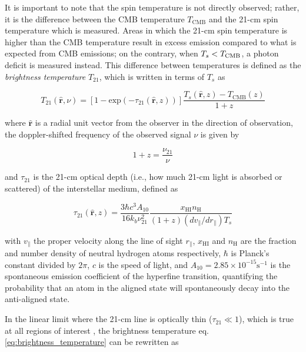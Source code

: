 \documentclass[floats,floatfix,showpacs,amssymb,prd,superscriptaddress,nofootinbib, 11pt]{revtex4-2} %
\newcommand{\lt}{\ensuremath <}
\begin{document}
It is important to note that the spin temperature is not directly observed; rather, it is the difference between the CMB temperature $T_{\text{CMB}}$ and the 21-cm spin temperature which is measured. Areas in which the 21-cm spin temperature is higher than the CMB temperature result in excess emission compared to what is expected from CMB emissions; on the contrary, when $T_s \lt T_{\text{CMB}}$, a photon deficit is measured instead. This difference between temperatures is defined as the \textit{brightness temperature} $T_{21}$, which is written in terms of $T_s$ as \citep{Furlanetto_2006}

\begin{equation}
    T_{21} (\hat{\textbf{r}}, \nu) = \left[1 - \text{exp}(-\tau_{21}(\hat{\textbf{r}}, z)) \right] \frac{T_s(\hat{\textbf{r}}, z) - T_{\text{CMB}} (z)}{1 + z}
    \label{eq:brightness_temperature}
\end{equation}

\noindent where $\hat{\textbf{r}}$ is a radial unit vector from the observer in the direction of observation, the doppler-shifted frequency of the observed signal $\nu$ is given by

\begin{equation}
    1 + z = \frac{\nu_{21}}{\nu}
\end{equation}

\noindent and $\tau_{21}$ is the 21-cm optical depth (i.e., how much 21-cm light is absorbed or scattered) of the interstellar medium, defined as 

\begin{equation}
    \tau_{21} (\hat{\textbf{r}}, z) = \frac{3 \hbar c^3 A_{10}}{16 k_b \nu^2_{21}} \frac{x_{\mathrm{HI}} n_\mathrm{H}}{(1 + z) (dv_{\parallel} / dr_{\parallel}) T_s}
    \label{eq:optical_depth}
\end{equation}

\noindent with $v_\parallel$ the proper velocity along the line of sight $r_\parallel$, $x_{\mathrm{HI}}$ and $n_{\mathrm{H}}$ are the fraction and number density of neutral hydrogen atoms respectively, $\hbar$ is Planck's constant divided by $2\pi$, $c$ is the speed of light, and $A_{10} = 2.85 \times 10^{-15} \text{s}^{-1}$ is the spontaneous emission coefficient of the hyperfine transition, quantifying the probability that an atom in the aligned state will spontaneously decay into the anti-aligned state. 

In the linear limit where the 21-cm line is optically thin ($\tau_{21} \ll 1$), which is true at all regions of interest \citep{Lewis_Challinor_2007}, the brightness temperature eq. \ref{eq:brightness_temperature} can be rewritten as \citep{Pritchard_Loeb_2012}
\end{document}
